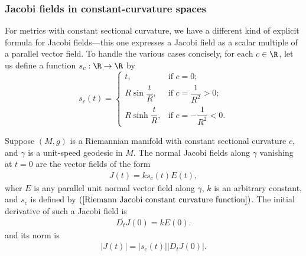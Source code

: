 \subsubsection{Jacobi fields in constant-curvature spaces}
For metrics with constant sectional curvature, we have a different kind of explicit formula for Jacobi fields---this one expresses a Jacobi field as a scalar multiple 
of a parallel vector field. To handle the various cases concisely, for each $c\in\R$, let us define a function $s_c:\R\to\R$ by
\begin{equation}\label{Riemann Jacobi constant curvature function}
s_c(t)=\begin{cases}
t,&\text{if $c=0$};\\[8pt]
R\sin\dfrac{t}{R},&\text{if $c=\dfrac{1}{R^2}>0$};\\[8pt]
R\sinh\dfrac{t}{R},&\text{if $c=-\dfrac{1}{R^2}<0$}.
\end{cases}
\end{equation}
\begin{proposition}\label{Riemann Jacobi constant curvature}
Suppose $(M,g)$ is a Riemannian manifold with constant sectional curvature $c$, and $\gamma$ is a unit-speed geodesic in $M$. The normal Jacobi fields along $\gamma$ 
vanishing at $t=0$ are the vector fields of the form
\begin{align}\label{Riemann Jacobi constant curvature-1}
J(t)=ks_c(t)E(t),
\end{align}
wher $E$ is any parallel unit normal vector field along $\gamma$, $k$ is an arbitrary constant, and $s_c$ is defined by $(\ref{Riemann Jacobi constant curvature function})$. 
The initial derivative of such a Jacobi field is
\begin{align}\label{Riemann Jacobi constant curvature-2}
D_tJ(0)=kE(0).
\end{align}
and its norm is
\begin{align}\label{Riemann Jacobi constant curvature-3}
|J(t)|=|s_c(t)||D_tJ(0)|.
\end{align}
\end{proposition}
